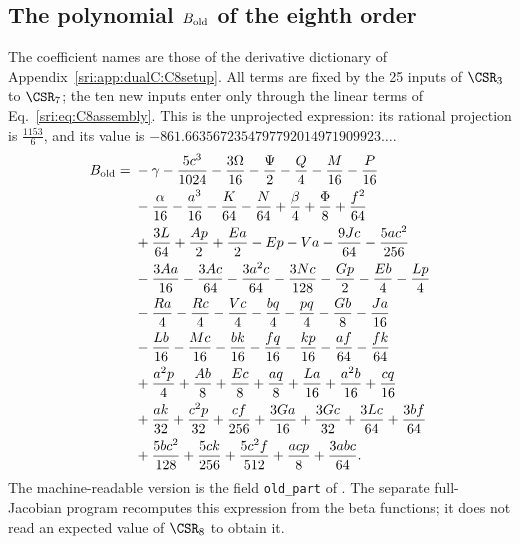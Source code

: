\subsection{The polynomial \texorpdfstring{$B_{\rm old}$}{B-old} of the eighth order}\label{sri:app:dualC:Bold}
The coefficient names are those of the derivative dictionary of Appendix~\ref{sri:app:dualC:C8setup}. All terms are fixed by
the 25 inputs of $\CSR_3$ to $\CSR_7$; the ten new inputs enter only through the linear terms of
Eq.~\eqref{sri:eq:C8assembly}. This is the unprojected expression: its rational projection is $\frac{1153}{6}$, and its
value is $-861.6635672354797792014971909923\ldots$.
\begin{align}
 B_{\rm old}={}&- \gamma - \frac{5 c^{3}}{1024} - \frac{3 \Omega}{16} - \frac{\Psi}{2} - \frac{Q}{4} - \frac{M}{16} - \frac{P}{16}\notag\\
 &- \frac{\alpha}{16} - \frac{a^{3}}{16} - \frac{K}{64} - \frac{N}{64} + \frac{\beta}{4} + \frac{\Phi}{8} + \frac{f^{2}}{64}\notag\\
 &+ \frac{3 L}{64} + \frac{A p}{2} + \frac{E a}{2} - E p - V a - \frac{9 J c}{64} - \frac{5 a c^{2}}{256}\notag\\
 &- \frac{3 A a}{16} - \frac{3 A c}{64} - \frac{3 a^{2} c}{64} - \frac{3 N c}{128} - \frac{G p}{2} - \frac{E b}{4} - \frac{L p}{4}\notag\\
 &- \frac{R a}{4} - \frac{R c}{4} - \frac{V c}{4} - \frac{b q}{4} - \frac{p q}{4} - \frac{G b}{8} - \frac{J a}{16}\notag\\
 &- \frac{L b}{16} - \frac{M c}{16} - \frac{b k}{16} - \frac{f q}{16} - \frac{k p}{16} - \frac{a f}{64} - \frac{f k}{64}\notag\\
 &+ \frac{a^{2} p}{4} + \frac{A b}{8} + \frac{E c}{8} + \frac{a q}{8} + \frac{L a}{16} + \frac{a^{2} b}{16} + \frac{c q}{16}\notag\\
 &+ \frac{a k}{32} + \frac{c^{2} p}{32} + \frac{c f}{256} + \frac{3 G a}{16} + \frac{3 G c}{32} + \frac{3 L c}{64} + \frac{3 b f}{64}\notag\\
 &+ \frac{5 b c^{2}}{128} + \frac{5 c k}{256} + \frac{5 c^{2} f}{512} + \frac{a c p}{8} + \frac{3 a b c}{64}.\label{sri:eq:dualC:Bold}
\end{align}
The machine-readable version is the field \texttt{old\_part} of
. The separate full-Jacobian program recomputes this
expression from the beta functions; it does not read an expected value of $\CSR_8$ to obtain it.

